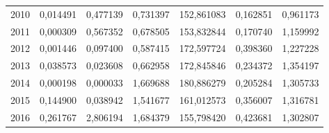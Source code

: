 \begin{table}
\begin{tabular}{p{1cm}p{2cm}p{2cm}p{2cm}p{2cm}p{2cm}p{2cm}}
 2010 &                 0,014491 &                         0,477139 &            0,731397 &                      152,861083 &                                           0,162851 &   0,961173 \\
 2011 &                 0,000309 &                         0,567352 &            0,678505 &                      153,832844 &                                           0,170740 &   1,159992 \\
 2012 &                 0,001446 &                         0,097400 &            0,587415 &                      172,597724 &                                           0,398360 &   1,227228 \\
 2013 &                 0,038573 &                         0,023608 &            0,662958 &                      172,845846 &                                           0,234372 &   1,354197 \\
 2014 &                 0,000198 &                         0,000033 &            1,669688 &                      180,886279 &                                           0,205284 &   1,305733 \\
 2015 &                 0,144900 &                         0,038942 &            1,541677 &                      161,012573 &                                           0,356007 &   1,316781 \\
 2016 &                 0,261767 &                         2,806194 &            1,684379 &                      155,798420 &                                           0,423681 &   1,302807 \\
\bottomrule
\end{tabular}
\end{table}
